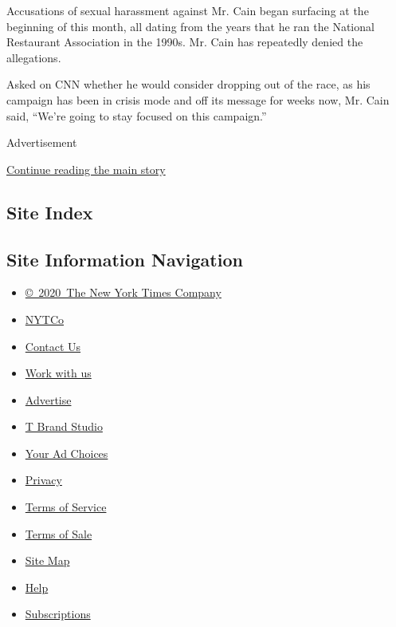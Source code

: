 Accusations of sexual harassment against Mr. Cain began surfacing at the
beginning of this month, all dating from the years that he ran the
National Restaurant Association in the 1990s. Mr. Cain has repeatedly
denied the allegations.

Asked on CNN whether he would consider dropping out of the race, as his
campaign has been in crisis mode and off its message for weeks now, Mr.
Cain said, ``We're going to stay focused on this campaign.''

Advertisement

\protect\hyperlink{after-bottom}{Continue reading the main story}

\hypertarget{site-index}{%
\subsection{Site Index}\label{site-index}}

\hypertarget{site-information-navigation}{%
\subsection{Site Information
Navigation}\label{site-information-navigation}}

\begin{itemize}
\tightlist
\item
  \href{https://help.nytimes.com/hc/en-us/articles/115014792127-Copyright-notice}{©~2020~The
  New York Times Company}
\end{itemize}

\begin{itemize}
\tightlist
\item
  \href{https://www.nytco.com/}{NYTCo}
\item
  \href{https://help.nytimes.com/hc/en-us/articles/115015385887-Contact-Us}{Contact
  Us}
\item
  \href{https://www.nytco.com/careers/}{Work with us}
\item
  \href{https://nytmediakit.com/}{Advertise}
\item
  \href{http://www.tbrandstudio.com/}{T Brand Studio}
\item
  \href{https://www.nytimes.com/privacy/cookie-policy\#how-do-i-manage-trackers}{Your
  Ad Choices}
\item
  \href{https://www.nytimes.com/privacy}{Privacy}
\item
  \href{https://help.nytimes.com/hc/en-us/articles/115014893428-Terms-of-service}{Terms
  of Service}
\item
  \href{https://help.nytimes.com/hc/en-us/articles/115014893968-Terms-of-sale}{Terms
  of Sale}
\item
  \href{https://spiderbites.nytimes.com}{Site Map}
\item
  \href{https://help.nytimes.com/hc/en-us}{Help}
\item
  \href{https://www.nytimes.com/subscription?campaignId=37WXW}{Subscriptions}
\end{itemize}
